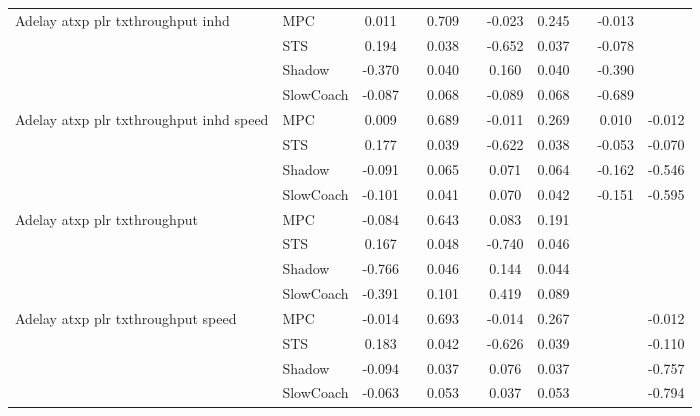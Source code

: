 \begin{tabular}{|l|l|*{9}{c|}}
\midrule
Adelay atxp plr txthroughput inhd    & MPC &    0.011 &        &     0.709 &     & -0.023 &  0.245 &      &  -0.013 &       \\
                              & STS &    0.194 &        &     0.038 &     & -0.652 &  0.037 &      &  -0.078 &       \\
                              & Shadow &   -0.370 &        &     0.040 &     &  0.160 &  0.040 &      &  -0.390 &       \\
                              & SlowCoach &   -0.087 &        &     0.068 &     & -0.089 &  0.068 &      &  -0.689 &       \\
\midrule
Adelay atxp plr txthroughput inhd speed    & MPC &    0.009 &        &     0.689 &     & -0.011 &  0.269 &      &   0.010 &   -0.012 \\
                              & STS &    0.177 &        &     0.039 &     & -0.622 &  0.038 &      &  -0.053 &   -0.070 \\
                              & Shadow &   -0.091 &        &     0.065 &     &  0.071 &  0.064 &      &  -0.162 &   -0.546 \\
                              & SlowCoach &   -0.101 &        &     0.041 &     &  0.070 &  0.042 &      &  -0.151 &   -0.595 \\
\midrule
Adelay atxp plr txthroughput    & MPC &   -0.084 &        &     0.643 &     &  0.083 &  0.191 &      &      &       \\
                              & STS &    0.167 &        &     0.048 &     & -0.740 &  0.046 &      &      &       \\
                              & Shadow &   -0.766 &        &     0.046 &     &  0.144 &  0.044 &      &      &       \\
                              & SlowCoach &   -0.391 &        &     0.101 &     &  0.419 &  0.089 &      &      &       \\
\midrule
Adelay atxp plr txthroughput speed    & MPC &   -0.014 &        &     0.693 &     & -0.014 &  0.267 &      &      &   -0.012 \\
                              & STS &    0.183 &        &     0.042 &     & -0.626 &  0.039 &      &      &   -0.110 \\
                              & Shadow &   -0.094 &        &     0.037 &     &  0.076 &  0.037 &      &      &   -0.757 \\
                              & SlowCoach &   -0.063 &        &     0.053 &     &  0.037 &  0.053 &      &      &   -0.794 \\

\end{tabular}
